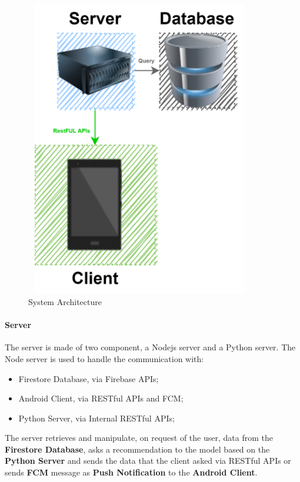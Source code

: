 \documentclass[../../main]{subfiles}
\begin{document}
    \begin{figure}[h]
        \centering
        \includegraphics[width=100mm,height=130mm]{images/simple.png}
        \caption{System Architecture}\label{system_architecture}
    \end{figure}

\paragraph*{Server}

The server is made of two component, a Nodejs server and a Python server.
The Node server is used to handle the communication with:
\begin{itemize}
    \item Firestore Database, via Firebase APIs;
    \item Android Client, via RESTful APIs and FCM;
    \item Python Server, via Internal RESTful APIs;
\end{itemize}
The server retrieves and manipulate, on request of the user, data from the \textbf{Firestore Database}, 
asks a recommendation to the model based on the \textbf{Python Server} 
and sends the data that the client asked via RESTful APIs or sends \textbf{FCM} message as \textbf{Push Notification} to the \textbf{Android Client}.
\end{document}
